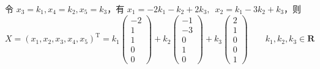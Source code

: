 \begin{enumerate}
          令 $ x_3 = k_1, x_4 = k_2, x_5 = k_3$，有 $x_1 = -2k_1 - k_2 + 2k_3,\enspace\allowbreak x_2 = k_1 - 3k_2 + k_3 $，则
          \[ X = (x_1, x_2, x_3, x_4, x_5)^\mathrm{T} = k_1 \begin{pmatrix} -2 \\ 1 \\ 1 \\ 0 \\ 0 \end{pmatrix} + k_2 \begin{pmatrix} -1 \\ -3 \\ 0 \\ 1 \\ 0 \end{pmatrix} + k_3 \begin{pmatrix} 2 \\ 1 \\ 0 \\ 0 \\ 1 \end{pmatrix} \qquad k_1, k_2, k_3 \in \mathbf{R} \]


\end{enumerate}
